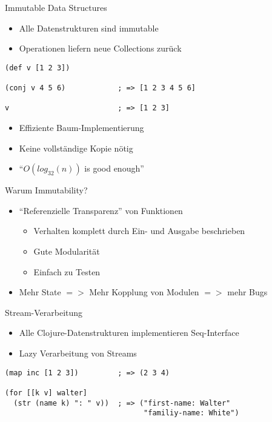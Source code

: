 \documentclass[presentation]{beamer}
\begin{document}
\begin{frame}[fragile]{Immutable Data Structures}
  \begin{itemize}
  \item Alle Datenstrukturen sind immutable
  \item Operationen liefern neue Collections zurück
  \end{itemize}
  \begin{block}{}
\begin{verbatim}
(def v [1 2 3])

(conj v 4 5 6)            ; => [1 2 3 4 5 6]

v                         ; => [1 2 3]
\end{verbatim}
  \end{block}
  \begin{itemize}
  \item Effiziente Baum-Implementierung
  \item Keine vollständige Kopie nötig
  \item ``$O(log_{32}(n))$ is good enough''
  \end{itemize}
\end{frame}

\begin{frame}{Warum Immutability?}
  \begin{itemize}
  \item ``Referenzielle Transparenz'' von Funktionen
    \begin{itemize}
    \item Verhalten komplett durch Ein- und Ausgabe beschrieben
    \item Gute Modularität
    \item Einfach zu Testen
    \end{itemize}
  \item Mehr State $=>$ Mehr Kopplung von Modulen $=>$ mehr Bugs
  \end{itemize}
\end{frame}

\begin{frame}[fragile]{Stream-Verarbeitung}
  \begin{itemize}
  \item Alle Clojure-Datenstrukturen implementieren Seq-Interface
  \item Lazy Verarbeitung von Streams
  \end{itemize}
  \begin{block}{}
\begin{verbatim}
(map inc [1 2 3])         ; => (2 3 4)

(for [[k v] walter]
  (str (name k) ": " v))  ; => ("first-name: Walter"
                                "familiy-name: White")

\end{verbatim}
  \end{block}
\end{frame}
\end{document}
